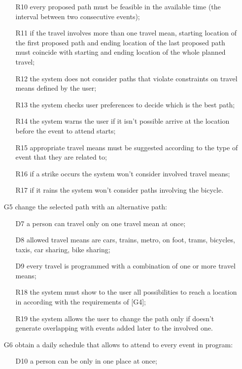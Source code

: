 \begin{itemize}
\begin{itemize}
	\newline
	\item[R10] every proposed path must be feasible in the available time (the interval between two consecutive events);
	\item[R11] if the travel involves more than one travel mean, starting location of the first proposed path and ending location of the last proposed path must coincide with starting and ending location of the whole planned travel;
	\item[R12] the system does not consider paths that violate constraints on travel means defined by the user;
	\item[R13] the system checks user preferences to decide which is the best path;
	\item[R14] the system warns the user if it isn’t possible arrive at the location before the event to attend starts;
	\item[R15] appropriate travel means must be suggested according to the type of event that they are related to; 
	\item[R16] if a strike occurs the system won’t consider involved travel means;
	\item[R17] if it rains the system won’t consider paths involving the bicycle.
	\end{itemize}
\item[G5] change the selected path with an alternative path:
	\begin{itemize}
	\item[D7] a person can travel only on one travel mean at once; 
	\item[D8] allowed travel means are cars, trains, metro, on foot, trams, bicycles, taxis, car sharing, bike sharing;
	\item[D9] every travel is programmed with a combination of one or more travel means;
	\newline
	\item[R18] the system must show to the user all possibilities to reach a location in according with the requirements of [G4];
	\item[R19] the system allows the user to change the path only if doesn’t generate overlapping with events added later to the involved one.
	\end{itemize}
\item[G6] obtain a daily schedule that allows to attend to every event in program:
	\begin{itemize}
	\item[D10] a person can be only in one place at once;

\end{itemize}
\end{itemize}

